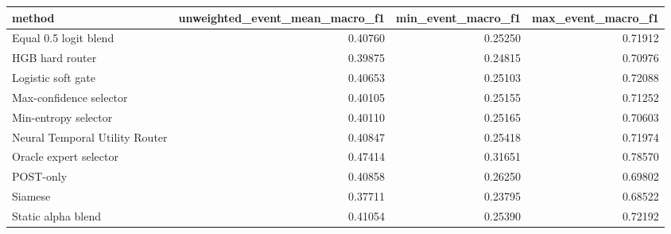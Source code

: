 \begin{tabular}{lrrr}
\toprule
method & unweighted\_event\_mean\_macro\_f1 & min\_event\_macro\_f1 & max\_event\_macro\_f1 \\
\midrule
Equal 0.5 logit blend & 0.40760 & 0.25250 & 0.71912 \\
HGB hard router & 0.39875 & 0.24815 & 0.70976 \\
Logistic soft gate & 0.40653 & 0.25103 & 0.72088 \\
Max-confidence selector & 0.40105 & 0.25155 & 0.71252 \\
Min-entropy selector & 0.40110 & 0.25165 & 0.70603 \\
Neural Temporal Utility Router & 0.40847 & 0.25418 & 0.71974 \\
Oracle expert selector & 0.47414 & 0.31651 & 0.78570 \\
POST-only & 0.40858 & 0.26250 & 0.69802 \\
Siamese & 0.37711 & 0.23795 & 0.68522 \\
Static alpha blend & 0.41054 & 0.25390 & 0.72192 \\
\bottomrule
\end{tabular}
